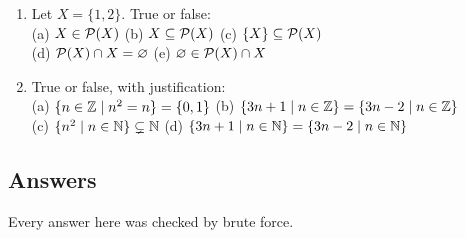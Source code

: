 \begin{enumerate}[label=\textbf{\arabic*.},leftmargin=1.8em,itemsep=0.35em]
  (b) How many proper subsets does $\{1,2,3,4,5\}$ have?
\\  (c) What is $|\setsP(\{1,2\})\cup\{1,2\}|$?
  \item Let $X=\{1,2\}$. True or false:\\ (a) $X\in\mathcal{P}(X)$ \quad (b) $X\subseteq\mathcal{P}(X)$ \quad (c) $\{X\}\subseteq\mathcal{P}(X)$\\ (d) $\mathcal{P}(X)\cap X=\varnothing$ \quad (e) $\varnothing\in\mathcal{P}(X)\cap X$
  \item True or false, with justification:\\
  (a) $\{n\in\mathbb{Z}\mathrel{|} n^2=n\}=\{0,1\}$ \quad
  (b) $\{3n+1\mathrel{|} n\in\mathbb{Z}\}=\{3n-2\mathrel{|} n\in\mathbb{Z}\}$\\
  (c) $\{n^2\mathrel{|} n\in\mathbb{N}\}\subsetneq\mathbb{N}$ \quad
  (d) $\{3n+1\mathrel{|} n\in\mathbb{N}\}=\{3n-2\mathrel{|} n\in\mathbb{N}\}$
\end{enumerate}

\subsection{Answers}

Every answer here was checked by brute force.

